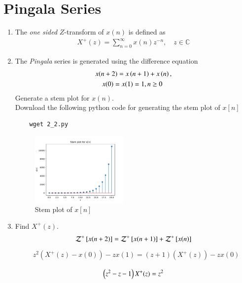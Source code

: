 \documentclass[journal,12pt,twocolumn]{IEEEtran}
\renewcommand\thesection{\arabic{section}}
\begin{document}
\section{Pingala Series}
\begin{enumerate}[label=\thesection.\arabic*,ref=\thesection.\theenumi]
\item The {\em one sided} $Z$-transform of $x(n)$ is defined as 
\begin{align}
	X^{+}(z) = \sum_{n = 0}^{\infty}x(n)z^{-n}, \quad z \in \mathbb{C}
\label{eq:one-Z}
\end{align}
	\item The {\em Pingala} series is generated using the difference equation 
\begin{align}
	&x(n+2) = x\left(n+1\right) + x\left(n\right),\\
	&\quad x(0) = x(1) = 1, n \ge 0
	\label{eq:10-pingala}
\end{align}
Generate a stem plot for $x(n)$.\\
\solution
Download the following python code for generating the stem plot of $x[n]$
\begin{lstlisting}
	wget 2_2.py
\end{lstlisting}
\begin{figure}[!ht]
	\centering
	\includegraphics[width=0.45\textwidth]{./figs/2_2.pdf}
	\caption{Stem plot of $x[n]$}
	\label{fig:2_2}
\end{figure}
\item Find $X^{+}(z)$.\\
\solution
\begin{align}
\mathcal{Z}^+{}\left[x(n + 2)\right] = \mathcal{Z}^+{}\left[x(n + 1)\right] + \mathcal{Z}^+{}\left[x(n)\right] 
\end{align}
\begin{align}
&z^2(X^+(z) - x(0)) - zx(1) = (z+1)(X^+(z)) - zx(0)
\end{align}

\begin{equation}
\left(z^2 - z - 1\right)X^+(z) = z^2 \\
\end{equation}


\end{enumerate}
\end{document}
